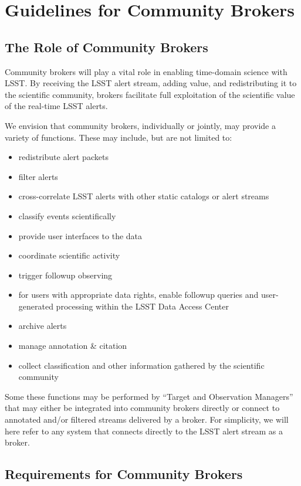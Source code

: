 \section{Guidelines for Community Brokers}\label{sec:community_brokers}

\subsection{The Role of Community Brokers}

Community brokers will play a vital role in enabling time-domain science with LSST.
By receiving the LSST alert stream, adding value, and redistributing it to the scientific community, brokers facilitate full exploitation of the scientific value of the real-time LSST alerts.

We envision that community brokers, individually or jointly, may provide a variety of functions.  These may include, but are not limited to:

\begin{itemize}
	\item redistribute alert packets
	\item filter alerts
	\item cross-correlate LSST alerts with other static catalogs or alert streams
	\item classify events scientifically
	\item provide user interfaces to the data
	\item coordinate scientific activity 
	\item trigger followup observing
	\item for users with appropriate data rights, enable followup queries and user-generated processing within the LSST Data Access Center
	\item archive alerts
	\item manage annotation \& citation 
	\item collect classification and other information gathered by the scientific community
\end{itemize}

Some these functions may be performed by ``Target and Observation Managers'' that may either be integrated into community brokers directly or connect to annotated and/or filtered streams delivered by a broker.
For simplicity, we will here refer to any system that connects directly to the LSST alert stream as a broker.

\subsection{Requirements for Community Brokers}

